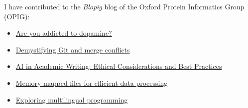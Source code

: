 I have contributed to the \textit{Blopig} blog of the Oxford Protein Informatics Group (OPIG):

\begin{itemize}
    \item \href{https://www.blopig.com/blog/2025/10/are-you-addicted-to-dopamine/}{Are you addicted to dopamine?}
    \item \href{https://www.blopig.com/blog/2025/05/demystifying-git-and-merge-conflicts/}{Demystifying Git and merge conflicts}
    \item \href{https://www.blopig.com/blog/2025/03/ai-in-academic-writing-ethical-considerations-and-best-practices/}{AI in Academic Writing: Ethical Considerations and Best Practices}
    \item \href{https://www.blopig.com/blog/2024/08/memory-mapped-files-for-efficient-data-processing/}{Memory-mapped files for efficient data processing}
    \item \href{https://www.blopig.com/blog/2024/04/exploring-multilingual-programming/}{Exploring multilingual programming}
\end{itemize}


\appendix

